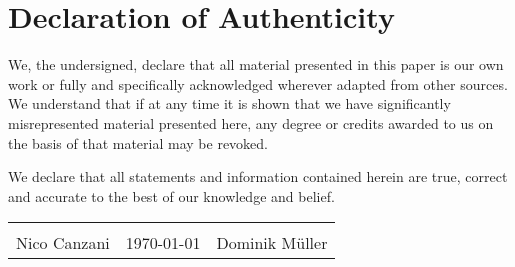 \chapter*{Declaration of Authenticity}

We, the undersigned, declare that all material presented in this paper is our own work or fully and specifically acknowledged wherever adapted from other sources.
We understand that if at any time it is shown that we have significantly misrepresented material presented here, any degree or credits awarded to us on the basis of that material may be revoked.

We declare that all statements and information contained herein are true, correct and accurate to the best of our knowledge and belief.

\vspace{1cm}
\begin{table}[h]
  \renewcommand{\arraystretch}{1.5}
  \begin{tabularx}{\textwidth}{C{5cm} >{\centering}X C{5cm}}
     & & \\  
    Nico Canzani & \today & Dominik M\"uller \\
  \end{tabularx}
\end{table}
